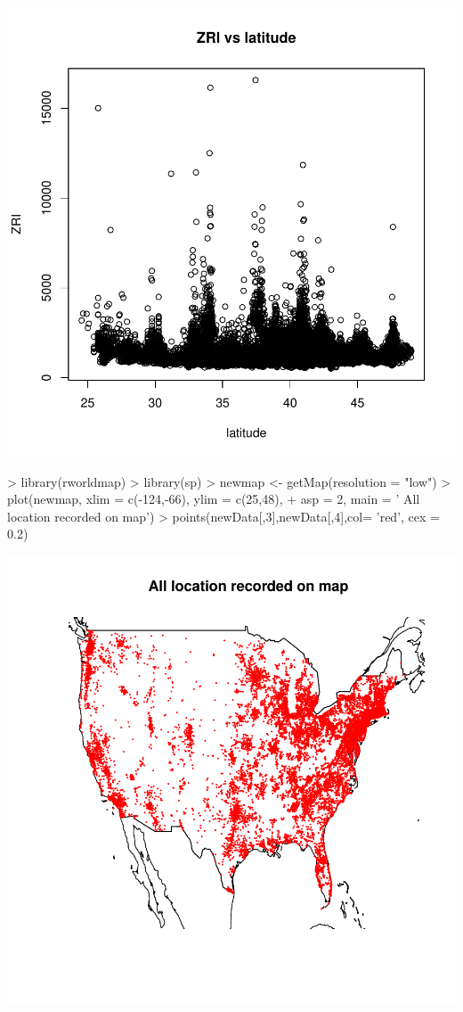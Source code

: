 \documentclass[a4paper]{article}
\begin{document}
\includegraphics{project_tex-test4}
\begin{Schunk}
\begin{Sinput}
> library(rworldmap)
> library(sp)
> newmap <- getMap(resolution = "low")
> plot(newmap, xlim = c(-124,-66), ylim = c(25,48), 
+      asp = 2, main = ' All location recorded on map')
> points(newData[,3],newData[,4],col= 'red', cex = 0.2)
\end{Sinput}
\end{Schunk}
\includegraphics{project_tex-test5}
\end{document}
